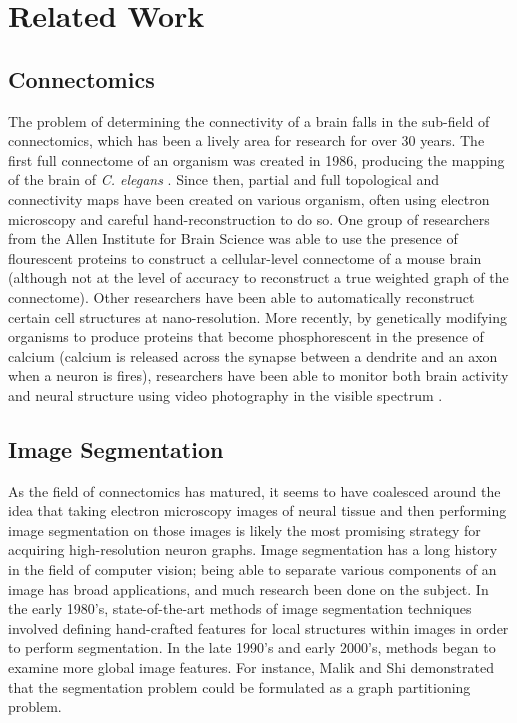 \section{Related Work}

\subsection{Connectomics}

The problem of determining the connectivity of a brain falls in the sub-field of connectomics, which has been a lively area for research for over 30 years. The first full connectome of an organism was created in 1986, producing the mapping of the brain of \textit{C. elegans} \cite{White1986}. Since then, partial and full topological and connectivity maps have been created on various organism, often using electron microscopy and careful hand-reconstruction to do so. One group of researchers from the Allen Institute for Brain Science was able to use the presence of flourescent proteins to construct a cellular-level connectome of a mouse brain (although not at the level of accuracy to reconstruct a true weighted graph of the connectome)\cite{Oh2014}. Other researchers have been able to automatically reconstruct certain cell structures at nano-resolution\cite{Kasthuri2015}. More recently, by genetically modifying organisms to produce proteins that become phosphorescent in the presence of calcium (calcium is released across the synapse between a dendrite and an axon when a neuron is fires), researchers have been able to monitor both brain activity and neural structure using video photography in the visible spectrum \cite{Nguyen2015}. 

\subsection{Image Segmentation}

As the field of connectomics has matured, it seems to have coalesced around the idea that taking electron microscopy images of neural tissue and then performing image segmentation on those images is likely the most promising strategy for acquiring high-resolution neuron graphs. Image segmentation has a long history in the field of computer vision; being able to separate various components of an image has broad applications, and much research been done on the subject. In the early 1980's, state-of-the-art methods of image segmentation techniques involved defining hand-crafted features for local structures within images in order to perform segmentation\cite{Haralick1985}. In the late 1990's and early 2000's, methods began to examine more global image features. For instance, Malik and Shi demonstrated that the segmentation problem could be formulated as a graph partitioning problem\cite{JianboShi2000}.

